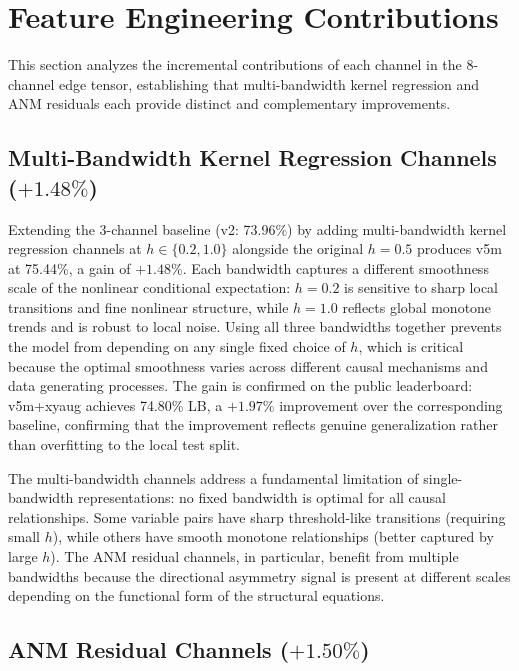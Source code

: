 \section{Feature Engineering Contributions}
\label{sec:feature_results}

This section analyzes the incremental contributions of each channel in the 8-channel edge tensor, establishing that multi-bandwidth kernel regression and ANM residuals each provide distinct and complementary improvements.

\subsection{Multi-Bandwidth Kernel Regression Channels ($+1.48\%$)}

Extending the 3-channel baseline (v2: 73.96\%) by adding multi-bandwidth kernel regression channels at $h \in \{0.2, 1.0\}$ alongside the original $h = 0.5$ produces v5m at 75.44\%, a gain of $+1.48\%$. Each bandwidth captures a different smoothness scale of the nonlinear conditional expectation: $h = 0.2$ is sensitive to sharp local transitions and fine nonlinear structure, while $h = 1.0$ reflects global monotone trends and is robust to local noise. Using all three bandwidths together prevents the model from depending on any single fixed choice of $h$, which is critical because the optimal smoothness varies across different causal mechanisms and data generating processes. The gain is confirmed on the public leaderboard: v5m+xyaug achieves 74.80\% LB, a $+1.97\%$ improvement over the corresponding baseline, confirming that the improvement reflects genuine generalization rather than overfitting to the local test split.

The multi-bandwidth channels address a fundamental limitation of single-bandwidth representations: no fixed bandwidth is optimal for all causal relationships. Some variable pairs have sharp threshold-like transitions (requiring small $h$), while others have smooth monotone relationships (better captured by large $h$). The ANM residual channels, in particular, benefit from multiple bandwidths because the directional asymmetry signal is present at different scales depending on the functional form of the structural equations.

\subsection{ANM Residual Channels ($+1.50\%$)}

